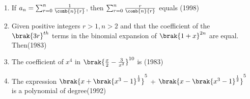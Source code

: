 \begin{enumerate}[label=\thesubsection.\arabic*,ref=\thesubsection.\theenumi]
\begin{enumerate}
\end{enumerate}
\item If $a_n = \sum_{r=0}^{n}\frac{1}{\comb{n}{r}}$, then $\sum_{r=0}^{n}\frac{r}{\comb{n}{r}}$ equals \hfill(1998)
\begin{enumerate}
\end{enumerate}
\item   Given positive integers $r>1,n>2$ and that the coefficient of the $\brak{3r}^{th}$ terms in the binomial expansion of $\brak{1+x}^{2n}$ are equal. Then\hfill(1983)
\begin{enumerate}
\end{enumerate}
\item The coefficient of $x^4$ in $\brak{\frac{x}{2}-\frac{3}{x^2}}^{10}$ is \hfill(1983)
	\begin{enumerate}[itemsep=1ex]
\end{enumerate}
\item The expression $\brak{x+\brak{x^3-1}^{\frac{1}{2}}}^5$ + $\brak{x-\brak{x^3-1}^{\frac{1}{2}}}^5$ is a polynomial of degree\hfill(1992)

\end{enumerate}
